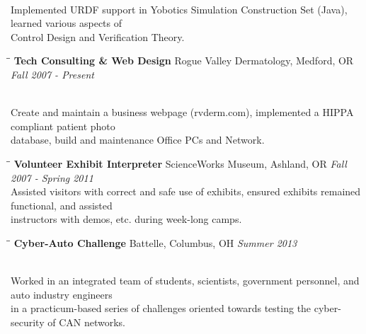 \documentclass{res}
\begin{document}
\begin{resume}
\begin{tabbing}
				\\ Implemented URDF support in Yobotics Simulation Construction Set (Java), learned various aspects of \\Control Design and Verification Theory.

			\end{tabbing}\vspace{-20pt}

			\begin{tabbing}
				\hspace{2.3in}\= \hspace{2.6in}\= \kill %
				{\bf Tech Consulting \& Web Design}	\>Rogue Valley Dermatology, Medford, OR	\> \textit{Fall 2007 - Present}

				\\Create and maintain a business webpage (rvderm.com), implemented a HIPPA compliant patient photo \\database, build and maintenance Office PCs and Network.

			\end{tabbing}\vspace{-20pt}

			\begin{tabbing}
				\hspace{2.3in}\= \hspace{2.6in}\= \kill %
				{\bf Volunteer Exhibit Interpreter}	\>ScienceWorks Museum, Ashland, OR	\> \textit{Fall 2007 - Spring 2011}
				\\Assisted visitors with correct and safe use of exhibits, ensured exhibits remained functional, and assisted \\instructors with demos, etc. during week-long camps.

			\end{tabbing}\vspace{-20pt}

			\begin{tabbing}
				\hspace{2.3in}\= \hspace{2.6in}\= \kill %
				{\bf Cyber-Auto Challenge}	\>Battelle, Columbus, OH	\> \textit{Summer 2013}

\\Worked in an integrated team of students, scientists, government personnel, and auto industry engineers \\in a practicum-based series of challenges oriented towards testing the cyber-security of CAN networks. 
			\end{tabbing}\vspace{-20pt}


\end{resume}
\end{document}
